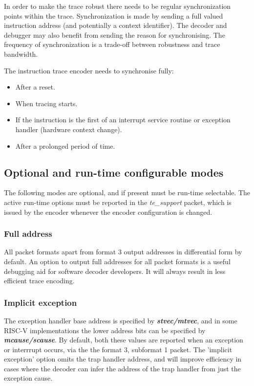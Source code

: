 In order to make the trace robust there needs to be regular
synchronization points within the trace. Synchronization is made by
sending a full valued instruction address (and potentially a context
identifier). The decoder and debugger may also benefit from sending
the reason for synchronising. The frequency of synchronization is a
trade-off between robustness and trace bandwidth.

The instruction trace encoder needs to synchronise fully:

\begin{itemize}

\item After a reset.
  \item When tracing starts.
\item If the instruction is the first of an interrupt service routine or
exception handler (hardware context change).
\item After a prolonged period of time.
\end{itemize}

\subsection{Optional and run-time configurable modes} \label{optional}

The following modes are optional, and if present must be run-time selectable.  The 
active run-time options must be reported in the \textit{te\_support} packet, which is issued by the
encoder whenever the encoder configuration is changed.

\subsubsection{Full address}

All packet formats apart from format 3 output addresses in differential form by default.
An option to output full addresses for all packet formats is a useful debugging aid for 
software decoder developers.  It will always result in less efficient trace encoding.

\subsubsection{Implicit exception}

The exception handler base address is specified by \textbf{\textit{stvec/mtvec}}, and 
in some RISC-V implementations the lower address bits can be specified by 
\textbf{\textit{mcause/scause}}.  
By default, both these values are reported when an exception or interrrupt occurs, 
via the the format 3, subformat 1 packet.  The 'implicit exception' option omits the 
trap handler address, and will improve efficiency in cases where the decoder can infer 
the address of the trap handler from just the exception cause.

